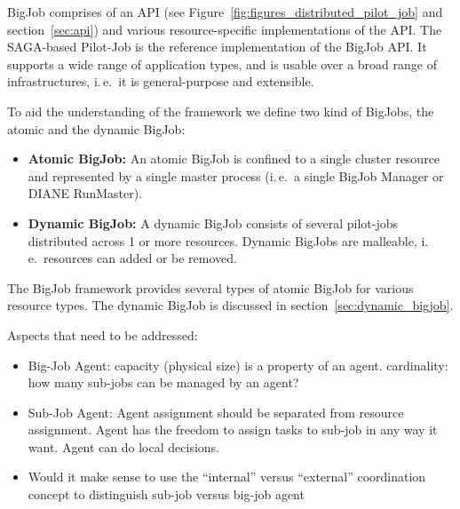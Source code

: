 \documentclass[]{article}
\newcommand{\jhanote}[1]{ {\textcolor{red} { ***shantenu: #1 }}}
\newcommand{\alnote}[1]{ {\textcolor{blue} { ***andre: #1 }}}
\newcommand{\alnote}[1]{}
\begin{document}

BigJob comprises of an API (see Figure~\ref{fig:figures_distributed_pilot_job}
and section~\ref{sec:api}) and various resource-specific implementations of the
API. The SAGA-based Pilot-Job is the reference implementation of the BigJob API.
It supports a wide range of application types, and is usable over a broad range
of infrastructures, i.\,e.\ it is general-purpose and extensible.


To aid the understanding of the framework we define two kind of BigJobs, the atomic and the dynamic BigJob:
\begin{itemize}
   \item  \textbf{Atomic BigJob:} An atomic BigJob is confined to a single 
   cluster resource and represented by a single master process (i.\,e.\ a 
   single BigJob Manager or DIANE RunMaster).
	\item \textbf{Dynamic BigJob:} A dynamic BigJob consists of several 
	pilot-jobs distributed across 1 or more resources. Dynamic BigJobs are 
	malleable, i.\,e.\ resources can added or be removed.
\end{itemize}
The BigJob framework provides several types of atomic BigJob for various 
resource types. The dynamic BigJob is discussed in section~\ref{sec:dynamic_bigjob}.


Aspects that need to be addressed:
\begin{itemize}
    \item Big-Job Agent: capacity (physical size) is a property of an agent. 
	cardinality: how many sub-jobs can be managed by an agent?
	\item Sub-Job Agent: Agent assignment should be separated from resource 
	assignment. Agent has the freedom to assign tasks to sub-job in any way 
	it want. Agent can do local decisions.    
  \item Would it make sense to use the ``internal'' versus
    ``external'' coordination concept to distinguish sub-job
    versus big-job agent
\end{itemize}
\end{document}
